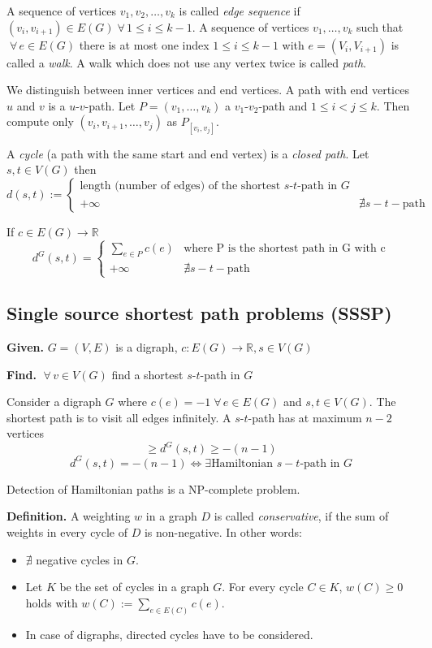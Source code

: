 \documentclass[a4paper]{article}
\theoremstyle{definition}
\newcommand{\given}[1]{\textbf{Given.} #1\par}
\newcommand{\find}[1]{\textbf{Find.} #1\par}
\newcommand{\gath}[2]{$#1$-$#2$-path} %
\newcommand{\fall}{\;\forall\,}
\begin{document}
A sequence of vertices $v_1, v_2, \ldots, v_k$ is called \emph{edge sequence} if $(v_i, v_{i+1}) \in E(G) \fall 1 \leq i \leq k-1$. A sequence of vertices $v_1, \ldots, v_k$ such that $\fall e \in E(G)$ there is at most one index $1 \leq i \leq k-1$ with $e = (V_i, V_{i+1})$ is called a \emph{walk}. A walk which does not use any vertex twice is called \emph{path}.

We distinguish between inner vertices and end vertices. A path with end vertices $u$ and $v$ is a \gath uv. Let $P = (v_1, \ldots, v_k)$ a \gath{v_1}{v_2} and $1 \leq i < j \leq k$. Then compute only $(v_i, v_{i+1}, \ldots, v_j)$ as $P_{[v_i, v_j]}$.

A \emph{cycle} (a path with the same start and end vertex) is a \emph{closed path}. Let $s, t \in V(G)$ then
\[
  d(s, t) := \left\{\begin{array}{lc}
    \text{length (number of edges) of the shortest \gath st in $G$} & \\
    +\infty & \nexists s-t-\text{path}
  \end{array}\right.
\]

If $c \in E(G) \rightarrow \mathbb{R}$
\[
    d^G(s, t) = \left\{\begin{array}{lc}
      \sum_{e \in P} c(e) & \text{where P is the shortest path in G with c} \\
      +\infty & \nexists s-t-\text{path}
    \end{array}\right.
\]

\subsection{Single source shortest path problems (SSSP)}
%
\given{$G = (V, E)$ is a digraph, $c: E(G) \rightarrow \mathbb{R}, s \in V(G)$}
\find{$\fall v \in V(G)$ find a shortest \gath st in $G$}

Consider a digraph $G$ where $c(e) = -1 \fall e \in E(G)$ and $s,t \in V(G)$. The shortest path is to visit all edges infinitely. A \gath st has at maximum $n-2$ vertices
\[
    \geq d^G(s, t) \geq -(n - 1)
\] \[
    d^G(s, t) = -(n - 1) \Leftrightarrow \exists \text{Hamiltonian $s-t$-path in $G$}
\]

Detection of Hamiltonian paths is a NP-complete problem.

\textbf{Definition.}
  A weighting $w$ in a graph $D$ is called \emph{conservative}, if the sum of weights in every cycle of $D$ is non-negative. In other words:
  \begin{itemize}
    \item $\nexists$ negative cycles in $G$.
    \item Let $K$ be the set of cycles in a graph $G$. For every cycle $C \in K$, $w(C) \geq 0$ holds with $w(C) := \sum_{e \in E(C)} c(e)$.
    \item In case of digraphs, directed cycles have to be considered.
  \end{itemize}
\end{document}
